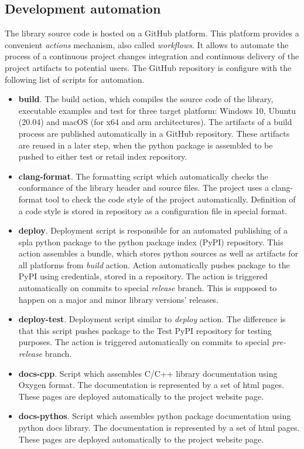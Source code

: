 \subsection{Development automation}

The library source code is hosted on a GitHub platform. This platform provides a convenient \textit{actions} mechanism, also called \textit{workflows}. It allows to automate the process of a continuous project changes integration and continuous delivery of the project artifacts to potential users. The GitHub repository is configure with the following list of scripts for automation.

\begin{itemize}
    \item \textbf{build}. The build action, which compiles the source code of the library, executable examples and test for three target platform: Windows 10, Ubuntu (20.04) and macOS (for x64 and arm architectures). The artifacts of a build process are published automatically in a GitHub repository. These artifacts are reused in a later step, when the python package is assembled to be pushed to either test or retail index repository.  
    
    \item \textbf{clang-format}. The formatting script which automatically checks the conformance of the library header and source files. The project uses a clang-format tool to check the code style of the project automatically. Definition of a code style is stored in repository as a configuration file in special format.  
    
    \item \textbf{deploy}. Deployment script is responsible for an automated publishing of a spla python package to the python package index (PyPI) repository. This action assembles a bundle, which stores python sources as well as artifacts for all platforms from \textit{build} action. Action automatically pushes package to the PyPI using credentials, stored in a repository. The action is triggered automatically on commits to special \textit{release} branch. This is supposed to happen on a major and minor library versions' releases. 
    
    \item \textbf{deploy-test}. Deployment script similar to \textit{deploy} action. The difference is that this script pushes package to the Test PyPI repository for testing purposes. The action is triggered automatically on commits to special \textit{pre-release} branch.
    
    \item \textbf{docs-cpp}. Script which assembles C/C++ library documentation using Oxygen format. The documentation is represented by a set of html pages. These pages are deployed automatically to the project website page. 
    
    \item \textbf{docs-pythos}. Script which assembles python package documentation using python docs library. The documentation is represented by a set of html pages. These pages are deployed automatically to the project website page. 
\end{itemize}

